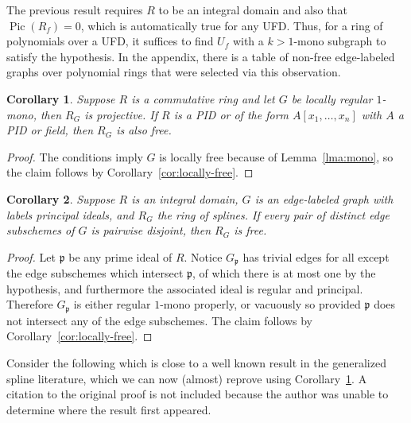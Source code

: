 \documentclass{article}
\DeclareMathOperator{\Pic}{Pic}
\newtheorem{corollary}{Corollary}
\begin{document}
The previous result requires $R$ to be an integral domain and also that $\Pic(R_f)=0$, which is automatically true for any UFD. Thus, for a ring of polynomials over a UFD, it suffices to find $U_f$ with a $k>1$-mono subgraph to satisfy the hypothesis. In the appendix, there is a table of non-free edge-labeled graphs over polynomial rings that were selected via this observation.

\begin{corollary}
\label{cor:mono-free-cor}
Suppose $R$ is a commutative ring and let $G$ be locally regular $1$-mono, then $R_G$ is projective. If $R$ is a PID or of the form $A[x_1,\dots,x_n]$ with $A$ a PID or field, then $R_G$ is also free.
\end{corollary}
\begin{proof}
The conditions imply $G$ is locally free because of Lemma~\ref{lma:mono}, so the claim follows by Corollary~\ref{cor:locally-free}.
\end{proof}

\begin{corollary}
Suppose $R$ is an integral domain, $G$ is an edge-labeled graph with labels principal ideals, and $R_G$ the ring of splines. If every pair of distinct edge subschemes of $G$ is pairwise disjoint, then $R_G$ is free.
\end{corollary}
\begin{proof}
Let $\mathfrak p$ be any prime ideal of $R$. Notice $G_{\mathfrak p}$ has trivial edges for all except the edge subschemes which intersect $\mathfrak p$, of which there is at most one by the hypothesis, and furthermore the associated ideal is regular and principal. Therefore $G_{\mathfrak p}$ is either regular $1$-mono properly, or vacuously so provided $\mathfrak p$ does not intersect any of the edge subschemes. The claim follows by Corollary~\ref{cor:locally-free}.
\end{proof}

Consider the following which is close to a well known result in the generalized spline literature, which we can now (almost) reprove using Corollary~\ref{cor:mono-free-cor}. A citation to the original proof is not included because the author was unable to determine where the result first appeared.
\end{document}
